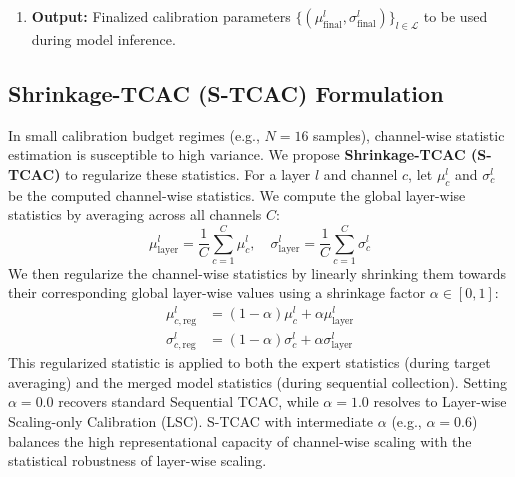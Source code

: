 \documentclass{article}
\theoremstyle{plain}
\theoremstyle{definition}
\theoremstyle{remark}
\begin{document}
\begin{enumerate}
\begin{itemize}
\begin{enumerate}
            \item Compute the channel-wise mean $\mu^{l_k}_{c, \text{merged}}$ and standard deviation $\sigma^{l_k}_{c, \text{merged}}$ over $\mathcal{D}_{\text{cal}}$.
            \item Store $(\mu^{l_k}_{\text{final}}, \sigma^{l_k}_{\text{final}}) = (\mu^{l_k}_{\text{merged}}, \sigma^{l_k}_{\text{merged}})$.
        \end{enumerate}
    \end{itemize}
    \item \textbf{Output:} Finalized calibration parameters $\{(\mu^l_{\text{final}}, \sigma^l_{\text{final}})\}_{l \in \mathcal{L}}$ to be used during model inference.
\end{enumerate}

\subsection{Shrinkage-TCAC (S-TCAC) Formulation}
In small calibration budget regimes (e.g., $N=16$ samples), channel-wise statistic estimation is susceptible to high variance. We propose \textbf{Shrinkage-TCAC (S-TCAC)} to regularize these statistics.
For a layer $l$ and channel $c$, let $\mu^l_c$ and $\sigma^l_c$ be the computed channel-wise statistics. We compute the global layer-wise statistics by averaging across all channels $C$:
\begin{equation}
\mu^l_{\text{layer}} = \frac{1}{C} \sum_{c=1}^C \mu^l_c, \quad \sigma^l_{\text{layer}} = \frac{1}{C} \sum_{c=1}^C \sigma^l_c
\end{equation}
We then regularize the channel-wise statistics by linearly shrinking them towards their corresponding global layer-wise values using a shrinkage factor $\alpha \in [0, 1]$:
\begin{align}
\mu^l_{c, \text{reg}} &= (1 - \alpha) \mu^l_c + \alpha \mu^l_{\text{layer}} \\
\sigma^l_{c, \text{reg}} &= (1 - \alpha) \sigma^l_c + \alpha \sigma^l_{\text{layer}}
\end{align}
This regularized statistic is applied to both the expert statistics (during target averaging) and the merged model statistics (during sequential collection). Setting $\alpha=0.0$ recovers standard Sequential TCAC, while $\alpha=1.0$ resolves to Layer-wise Scaling-only Calibration (LSC). S-TCAC with intermediate $\alpha$ (e.g., $\alpha=0.6$) balances the high representational capacity of channel-wise scaling with the statistical robustness of layer-wise scaling.
\end{document}
